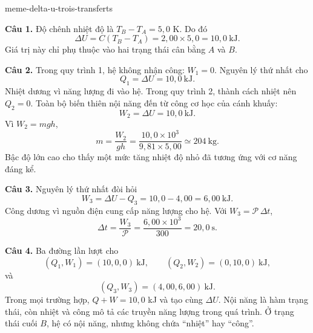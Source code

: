 \begin{exo}{meme-delta-u-trois-transferts}
\begin{solution}
\textbf{Câu 1.} Độ chênh nhiệt độ là $T_B-T_A=5{,}0$ K. Do đó
\[
\Delta U=C(T_B-T_A)=2{,}00\times5{,}0=10{,}0\ \mathrm{kJ}.
\]
Giá trị này chỉ phụ thuộc vào hai trạng thái cân bằng $A$ và $B$.

\textbf{Câu 2.} Trong quy trình 1, hệ không nhận công: $W_1=0$. Nguyên lý thứ nhất cho
\[
Q_1=\Delta U=10{,}0\ \mathrm{kJ}.
\]
Nhiệt dương vì năng lượng đi vào hệ. Trong quy trình 2, thành cách nhiệt nên $Q_2=0$.
Toàn bộ biến thiên nội năng đến từ công cơ học của cánh khuấy:
\[
W_2=\Delta U=10{,}0\ \mathrm{kJ}.
\]
Vì $W_2=mgh$,
\[
m=\frac{W_2}{gh}
=\frac{10{,}0\times10^3}{9{,}81\times5{,}00}
\simeq204\ \mathrm{kg}.
\]
Bậc độ lớn cao cho thấy một mức tăng nhiệt độ nhỏ đã tương ứng với cơ năng đáng kể.

\textbf{Câu 3.} Nguyên lý thứ nhất đòi hỏi
\[
W_3=\Delta U-Q_3=10{,}0-4{,}00=6{,}00\ \mathrm{kJ}.
\]
Công dương vì nguồn điện cung cấp năng lượng cho hệ. Với $W_3=\mathcal P\,\Delta t$,
\[
\Delta t=\frac{W_3}{\mathcal P}=\frac{6{,}00\times10^3}{300}=20{,}0\ \mathrm{s}.
\]

\textbf{Câu 4.} Ba đường lần lượt cho
\[
(Q_1,W_1)=(10{,}0,0)\ \mathrm{kJ},\qquad
(Q_2,W_2)=(0,10{,}0)\ \mathrm{kJ},
\]
và
\[
(Q_3,W_3)=(4{,}00,6{,}00)\ \mathrm{kJ}.
\]
Trong mọi trường hợp, $Q+W=10{,}0$ kJ và tạo cùng $\Delta U$. Nội năng là hàm trạng thái,
còn nhiệt và công mô tả các truyền năng lượng trong quá trình. Ở trạng thái cuối $B$, hệ có nội năng,
nhưng không chứa “nhiệt” hay “công”.
\end{solution}
\end{exo}

